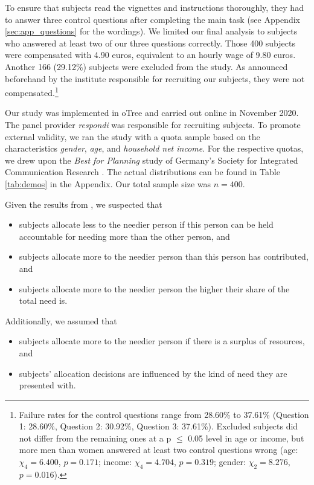 \documentclass[egregdoesnotlikesansseriftitles]{scrartcl}
\begin{document}
To ensure that subjects read the vignettes and instructions thoroughly, they had to answer three control questions after completing the main task (see Appendix \ref{sec:app_questions} for the wordings).
We limited our final analysis to subjects who answered at least two of our three questions correctly.
Those 400 subjects were compensated with 4.90 euros, equivalent to an hourly wage of 9.80 euros.
Another 166 (29.12\%) subjects were excluded from the study.
As announced beforehand by the institute responsible for recruiting our subjects, they were not compensated.\footnote{Failure rates for the control questions range from 28.60\% to 37.61\% (Question 1: 28.60\%, Question 2: 30.92\%, Question 3: 37.61\%). Excluded subjects did not differ from the remaining ones at a p $\le$ 0.05 level in age or income, but more men than women answered at least two control questions wrong (age: $\chi_4=6.400$, $p=0.171$; income: $\chi_4=4.704$, $p=0.319$; gender: $\chi_2=8.276$, $p=0.016$).}

Our study was implemented in oTree \citep{chen_otree_2016} and carried out online in November 2020.
The panel provider \textit{respondi} was responsible for recruiting subjects.
To promote external validity, we ran the study with a quota sample based on the characteristics \textit{gender}, \textit{age}, and \textit{household net income}.
For the respective quotas, we drew upon the \textit{Best for Planning} study of Germany's Society for Integrated Communication Research \citep[p. 284, 291]{gesellschaft_fur_integrierte_kommunikationsforschung_best_2019}.
The actual distributions can be found in Table \ref{tab:demos} in the Appendix.
Our total sample size was $n=400$.

Given the results from \cite{bauer_need_2020}, we suspected that
\begin{itemize}
	\item[(1)] subjects allocate less to the needier person if this person can be held accountable for needing more than the other person, and
	\item[(2)] subjects allocate more to the needier person than this person has contributed, and
	\item[(3)] subjects allocate more to the needier person the higher their share of the total need is.
\end{itemize}

\noindent Additionally, we assumed that
\begin{itemize}
	\item[(4)] subjects allocate more to the needier person if there is a surplus of resources, and
	\item[(5)] subjects' allocation decisions are influenced by the kind of need they are presented with.
\end{itemize}
\end{document}
